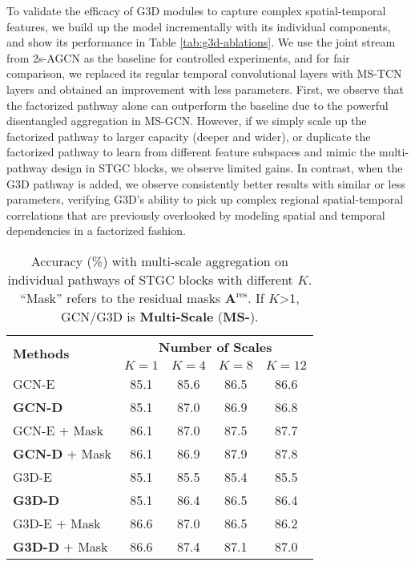 \documentclass[10pt,twocolumn,letterpaper]{article}
\begin{document}
To validate the efficacy of G3D modules to capture complex spatial-temporal features, we build up the model incrementally with its individual components, and show its performance in Table \ref{tab:g3d-ablations}.
We use the joint stream from 2s-AGCN \cite{2s-AGCN} as the baseline for controlled experiments, and for fair comparison, we replaced its regular temporal convolutional layers with MS-TCN layers and obtained an improvement with less parameters.
First, we observe that the factorized pathway alone can outperform the baseline due to the powerful disentangled aggregation in MS-GCN.
However, if we simply scale up the factorized pathway to larger capacity (deeper and wider), or duplicate the factorized pathway to learn from different feature subspaces and mimic the multi-pathway design in STGC blocks, we observe limited gains.
In contrast, when the G3D pathway is added, we observe consistently better results with similar or less parameters, verifying G3D's ability to pick up complex regional spatial-temporal correlations that are previously overlooked by modeling spatial and temporal dependencies in a factorized fashion.









\begin{table}[t]
\centering
\begin{tabular}{lcccc}
\hline
\multirow{2}{*}{\textbf{Methods}} & \multicolumn{4}{c}{\textbf{Number of Scales}} \\
& \small $K=1$ & \small $K=4$ & \small $K=8$ & \small $K=12$ \\ \hline \hline
GCN-E & 85.1 & 85.6 & 86.5 & 86.6 \\
\textbf{GCN-D} & 85.1 & 87.0 & 86.9 & 86.8 \\ \hline
GCN-E + Mask & 86.1 & 87.0 & 87.5 & 87.7 \\
\textbf{GCN-D} + Mask & 86.1 & 86.9 & 87.9 & 87.8 \\ \hline \hline
G3D-E & 85.1 & 85.5 & 85.4 & 85.5 \\
\textbf{G3D-D} & 85.1 & 86.4 & 86.5 & 86.4 \\ \hline
G3D-E + Mask & 86.6 & 87.0 & 86.5 & 86.2 \\
\textbf{G3D-D} + Mask & 86.6 & 87.4 & 87.1 & 87.0 \\ \hline
\end{tabular}
\caption{
Accuracy (\%) with multi-scale aggregation on individual pathways of STGC blocks with different $K$.
``Mask'' refers to the residual masks $\mathbf{A}^\text{res}$.
If $K$\textgreater 1, GCN/G3D is \textbf{Multi-Scale} (\textbf{MS-}).
}
\label{tab:ablation-disentangled}
\vspace{-0mm}\end{table}
\end{document}
